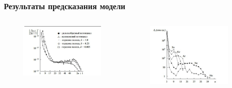 \documentclass[handout]{beamer}
\begin{document}
\begin{frame}
    \frametitle{Результаты предсказания модели}

    \begin{columns}
        \begin{column}{0.5\textwidth}
            \begin{figure}[h]
                \centering
                \includegraphics[width=1\textwidth]{new/theor_samp.jpg}
            \end{figure}
        \end{column}
        
        \begin{column}{0.5\textwidth}
            \begin{figure}[h]
                \centering
                \includegraphics[width=1\textwidth]{new/samp.jpg}
            \end{figure}
        \end{column}
      \end{columns}
\end{frame}
\end{document}
